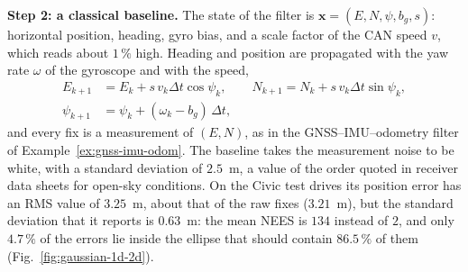 \textbf{Step 2: a classical baseline.} The state of the filter is $\mathbf{x}=(E,N,\psi,b_g,s)$: horizontal position, heading, gyro bias, and a scale factor of the CAN speed $v$, which reads about $1\,\%$ high. Heading and position are propagated with the yaw rate $\omega$ of the gyroscope and with the speed,
\begin{equation}
\begin{aligned}
E_{k+1}&=E_k+s\,v_k\Delta t\cos\psi_k, \qquad N_{k+1}=N_k+s\,v_k\Delta t\sin\psi_k,\\
\psi_{k+1}&=\psi_k+(\omega_k-b_g)\,\Delta t,
\end{aligned}
\label{eq:c2k-process}
\end{equation}
and every fix is a measurement of $(E,N)$, as in the GNSS--IMU--odometry filter of Example~\ref{ex:gnss-imu-odom}. The baseline takes the measurement noise to be white, with a standard deviation of $2.5$~m, a value of the order quoted in receiver data sheets for open-sky conditions. On the Civic test drives its position error has an RMS value of $3.25$~m, about that of the raw fixes ($3.21$~m), but the standard deviation that it reports is $0.63$~m: the mean NEES is $134$ instead of $2$, and only $4.7\,\%$ of the errors lie inside the ellipse that should contain $86.5\,\%$ of them (Fig.~\ref{fig:gaussian-1d-2d}).

